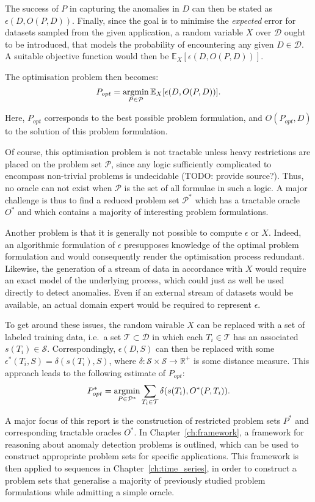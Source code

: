 The success of $P$ in capturing the anomalies in $D$ can then be stated as $\epsilon(D, O(P, D))$. Finally, since the goal is to minimise the \emph{expected} error for datasets sampled from the given application, a random variable $X$ over $\mathcal{D}$ ought to be introduced, that models the probability of encountering any given $D \in \mathcal{D}$. A suitable objective function would then be $\mathbb{E}_X [\epsilon(D, O(P, D))]$.

The optimisation problem then becomes:
\[
    P_{opt} = \argmin_{P \in \mathcal{P}}\mathbb{E}_X [ \epsilon(D, O(P, D)) ].
\]

Here, $P_{opt}$ corresponds to the best possible problem formulation, and $O(P_{opt}, D)$ to the solution of this problem formulation.

Of course, this optimisation problem is not tractable unless heavy restrictions are placed on the problem set $\mathcal{P}$, since any logic sufficiently complicated to encompass non-trivial problems is undecidable (TODO: provide source?). Thus, no oracle can not exist when $\mathcal{P}$ is the set of all formulae in such a logic. A major challenge is thus to find a reduced problem set $\mathcal{P}^*$ which has a tractable oracle $O^*$ and which contains a majority of interesting problem formulations.

Another problem is that it is generally not possible to compute $\epsilon$ or $X$. Indeed, an algorithmic formulation of $\epsilon$ presupposes knowledge of the optimal problem formulation and would consequently render the optimisation process redundant. Likewise, the generation of a stream of data in accordance with $X$ would require an exact model of the underlying process, which could just as well be used directly to detect anomalies. Even if an external stream of datasets would be available, an actual domain expert would be required to represent $\epsilon$.

To get around these issues, the random vairable $X$ can be replaced with a set of labeled training data, i.e.\ a set $\mathcal{T} \subset \mathcal{D}$ in which each $T_i \in \mathcal{T}$ has an associated $s(T_i) \in \mathcal{S}$.
Correspondingly, $\epsilon(D, S)$ can then be replaced with some $\epsilon^*(T_i, S) = \delta(s(T_i), S)$, where $\delta: \mathcal{S} \times \mathcal{S} \rightarrow \mathbb{R}^+$ is some distance measure.
This approach leads to the following estimate of $P_{opt}$:
\[
    P^*_{opt} = \argmin_{P \in \mathcal{P}^*} \sum_{T_i \in \mathcal{T}} \delta(s(T_i), O^*(P, T_i)).
\]

A major focus of this report is the construction of restricted problem sets $P^*$ and corresponding tractable oracles $O^*$. In Chapter~\ref{ch:framework}, a framework for reasoning about anomaly detection problems is outlined, which can be used to construct appropriate problem sets for specific applications. This framework is then applied to sequences in Chapter~\ref{ch:time_series}, in order to construct a problem sets that generalise a majority of previously studied problem formulations while admitting a simple oracle.
